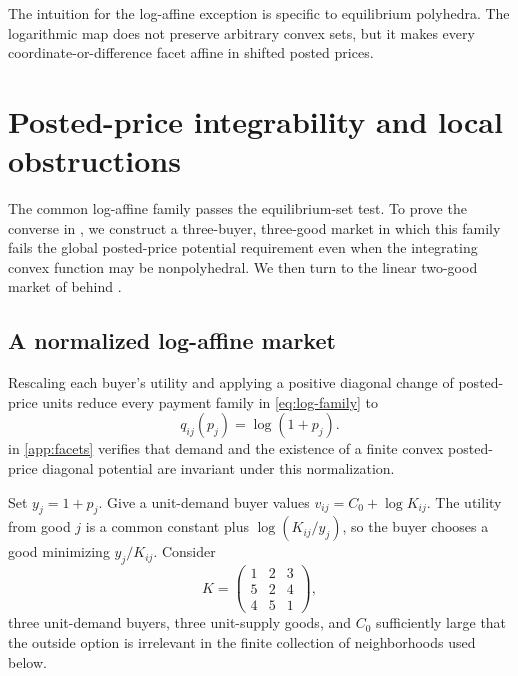 The intuition for the log-affine exception is specific to equilibrium polyhedra. The logarithmic map does not preserve arbitrary convex sets, but it makes every coordinate-or-difference facet affine in shifted posted prices.

\section{Posted-price integrability and local obstructions}\label{sec:holonomy}

The common log-affine family passes the equilibrium-set test. To prove the converse in , we construct a three-buyer, three-good market in which this family fails the global posted-price potential requirement even when the integrating convex function may be nonpolyhedral. We then turn to the linear two-good market of  behind .

\subsection{A normalized log-affine market}\label{subsec:normalized-log-market}

Rescaling each buyer's utility and applying a positive diagonal change of posted-price units reduce every payment family in \eqref{eq:log-family} to
\begin{equation}\label{eq:normalized-log}
q_{ij}(p_j)=\log(1+p_j).
\end{equation}
 in \ref{app:facets} verifies that demand and the existence of a finite convex posted-price diagonal potential are invariant under this normalization.

Set $y_j=1+p_j$. Give a unit-demand buyer values $v_{ij}=C_0+\log K_{ij}$. The utility from good $j$ is a common constant plus $\log(K_{ij}/y_j)$, so the buyer chooses a good minimizing $y_j/K_{ij}$. Consider
\begin{equation}\label{eq:K-matrix}
K=
\begin{pmatrix}
1&2&3\\
5&2&4\\
4&5&1
\end{pmatrix},
\end{equation}
three unit-demand buyers, three unit-supply goods, and $C_0$ sufficiently large that the outside option is irrelevant in the finite collection of neighborhoods used below.

